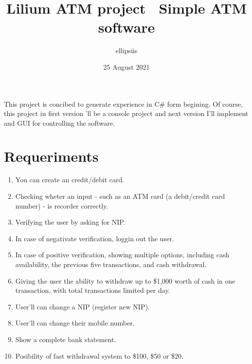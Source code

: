 \documentclass[letterpaper, 12pt]{article}
\title{Lilium ATM project \ Simple ATM software}
\author{\@ ellipsiis}
\date{25 August 2021}
\begin{document}
\maketitle
    This project is concibed to generate experience in C\# form begining. Of course, this project in first version
    'll be a console project and next version I'll implement and GUI for controlling the software.
    \section*{Requeriments}
    \begin{enumerate}
        \item You can create an credit/debit card.
        \item Checking wheter an input - such as an ATM card (a debit/credit card number) - is recorder correctly.
        \item Verifying the user by asking for NIP.
        \item In case of negativate verification, loggin out the user.
        \item In case of positive verification, showing multiple options, including cash availability,
        the previous five transactions, and cash withdrawal.
        \item Giving the user the ability to withdraw up to \$1,000 worth of cash in one transaction,
        with total transactions limited per day.
        \item User'll can change a NIP (register new NIP).
        \item User'll can change their mobile number.
        \item Show a complete bank statement.
        \item Posibility of fast withdrawal system to \$100, \$50 or \$20.

    \end{enumerate}
\end{document}
